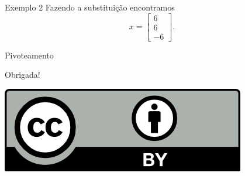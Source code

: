 \documentclass[]{beamer}
\begin{document}
\begin{frame}{Exemplo 2}
Fazendo a substituição encontramos  $$x=\begin{bmatrix}6\\ 6\\ -6\end{bmatrix}.$$
\end{frame}

\begin{frame}{Pivoteamento}

\end{frame}

\begin{frame}
\vfill
\vfill
\vfill
\begin{center}
	\Huge Obrigada!
\end{center}
\vfill
\vfill
\begin{center}
    \href{http://creativecommons.org/licenses/by/4.0/}{\includegraphics{figures/by.png}} \end{center}

\end{frame}
\end{document}
